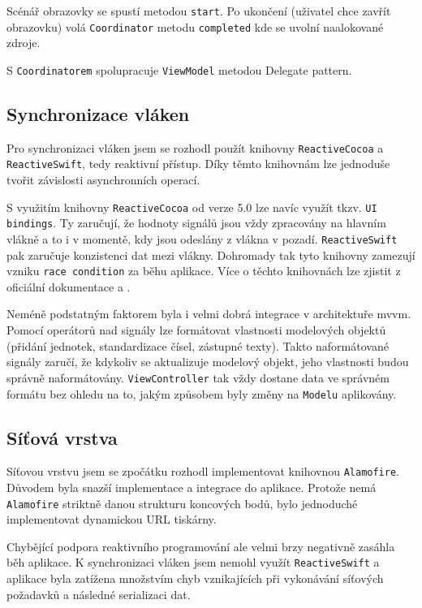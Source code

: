 Scénář obrazovky se spustí metodou \texttt{start}.
Po ukončení (uživatel chce zavřít obrazovku) volá \texttt{Coordinator} metodu \texttt{completed} kde se uvolní naalokované zdroje.

S \texttt{Coordinatorem} spolupracuje \texttt{ViewModel} metodou Delegate pattern.

\subsection{Synchronizace vláken}

Pro synchronizaci vláken jsem se rozhodl použít knihovny \texttt{ReactiveCocoa} a \texttt{ReactiveSwift}, tedy reaktivní přístup.
Díky těmto knihovnám lze jednoduše tvořit závislosti asynchronních operací.

S využitím knihovny \texttt{ReactiveCocoa} od verze 5.0 lze navíc využít tkzv. \texttt{UI bindings}.
Ty zaručují, že hodnoty signálů jsou vždy zpracovány na hlavním vlákně a to i v momentě, kdy jsou odeslány z vlákna v pozadí.
\texttt{ReactiveSwift} pak zaručuje konzistenci dat mezi vlákny.
Dohromady tak tyto knihovny zamezují vzniku \texttt{race condition} za běhu aplikace.
Více o těchto knihovnách lze zjistit z oficiální dokumentace \cite{github-reactiveswift} a \cite{github-reactivecocoa}.

Neméně podstatným faktorem byla i velmi dobrá integrace v architektuře \acrshort{mvvm}.
Pomocí operátorů nad signály lze formátovat vlastnosti modelových objektů (přidání jednotek, standardizace čísel, zástupné texty).
Takto naformátované signály zaručí, že kdykoliv se aktualizuje modelový objekt, jeho vlastnosti budou správně naformátovány.
\texttt{ViewController} tak vždy dostane data ve správném formátu bez ohledu na to, jakým způsobem byly změny na \texttt{Modelu} aplikovány.

\subsection{Síťová vrstva}

Síťovou vrstvu jsem se zpočátku rozhodl implementovat knihovnou \texttt{Alamofire}.
Důvodem byla snazší implementace a integrace do aplikace.
Protože nemá \texttt{Alamofire} striktně danou strukturu koncových bodů, bylo jednoduché implementovat dynamickou URL tiskárny.

Chybějící podpora reaktivního programování ale velmi brzy negativně zasáhla běh aplikace.
K synchronizaci vláken jsem nemohl využít \texttt{ReactiveSwift} a aplikace byla zatížena množstvím chyb vznikajících při vykonávání síťových požadavků a následné serializaci dat.

